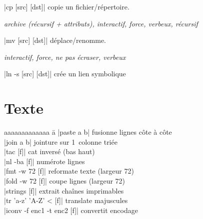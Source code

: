 \documentclass{article}
\newenvironment{cmdblock}{%
  \par\setlength{\parindent}{0pt}\setlength{\parskip}{0pt}%
  \RaggedRight%
}{\par}
\newlength{\cmdoptindent}
\newcommand{\cmdopt}[1]{%
  \hspace*{\cmdoptindent}%
  \begin{minipage}[t]{\dimexpr\linewidth-\cmdoptindent\relax}
    \RaggedRight \itshape #1%
  \end{minipage}\par
}
\begin{document}
\begin{multicols}{4}
\begin{cmdblock}
        \code|cp [src] [dst]| \quad copie un fichier/répertoire. \\
        \cmdopt{ archive (récursif + attributs),
            \codx{-i} interactif,
            \codx{-f} force,
            \codx{-v} verbeux,
            \codx{-r} récursif}
        \code|mv [src] [dst]| \quad déplace/renomme. \\
        \cmdopt{ interactif,
             force,
            \codx{-n} ne pas écraser,
            \codx{-v} verbeux}
        \code|ln -s [src] [dst]| \quad crée un lien symbolique
    \end{cmdblock}

    \section*{Texte}
    \begin{tabbing}
        aaaaaaaaaaaaa \= a \kill
        \code|paste a b| \> fusionne lignes côte à côte \\
        \code|join a b| \> jointure sur 1\iere\ colonne triée \\
        \code|tac [f]| \> cat inversé (bas \textrightarrow{} haut) \\
        \code|nl -ba [f]| \> numérote lignes \\
        \code|fmt -w 72 [f]| \> reformate texte (largeur 72) \\
        \code|fold -w 72 [f]| \> coupe lignes (largeur 72) \\
        \code|strings [f]| \> extrait chaînes imprimables \\
        \code|tr 'a-z' 'A-Z' < [f]| translate majuscules \\
        \code|iconv -f enc1 -t enc2 [f]| convertit encodage
    \end{tabbing}


\end{multicols}
\end{document}
